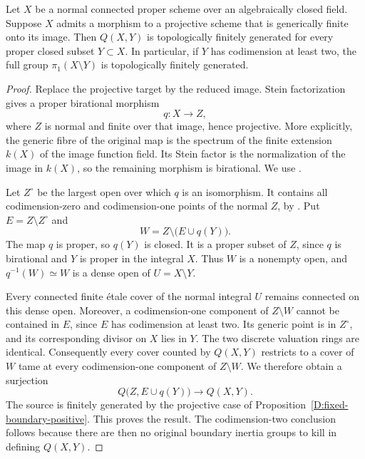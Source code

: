 \begin{proposition}
\label{D:generically-finite-projective-target}
Let $X$ be a normal connected proper scheme over an
algebraically closed field.  Suppose $X$ admits a morphism
to a projective scheme that is generically finite onto its
image.  Then $Q(X,Y)$ is topologically finitely generated
for every proper closed subset $Y\subset X$.
In particular, if $Y$ has codimension at least two, the
full group $\pi_1(X\setminus Y)$ is topologically finitely
generated.
\end{proposition}
\begin{proof}
Replace the projective target by the reduced image.
Stein factorization gives a proper birational morphism
\[
                              q:X\longrightarrow Z,
\]
where $Z$ is normal and finite over that image, hence
projective.  More explicitly, the generic fibre of the
original map is the spectrum of the finite extension
$k(X)$ of the image function field.  Its Stein factor
is the normalization of the image in $k(X)$, so the
remaining morphism is birational.  We use
\cite[Theorem 37.53.4, tag 03H0]{C_StacksFibration}.

Let $Z^\circ$ be the largest open over which $q$ is an
isomorphism.  It contains all codimension-zero and
codimension-one points of the normal $Z$, by
\cite[Lemma 33.17.3, tag 0BFP]{C_StacksProjectiveTarget}.
Put $E=Z\setminus Z^\circ$ and
\[
                  W=Z\setminus\bigl(E\cup q(Y)\bigr).
\]
The map $q$ is proper, so $q(Y)$ is closed.  It is a proper
subset of $Z$, since $q$ is birational and $Y$ is proper
in the integral $X$.  Thus $W$ is a nonempty open, and
$q^{-1}(W)\simeq W$ is a dense open of $U=X\setminus Y$.

Every connected finite \'etale cover of the normal
integral $U$ remains connected on this dense open.
Moreover, a codimension-one component of
$Z\setminus W$ cannot be contained in $E$, since $E$
has codimension at least two.  Its generic point is in
$Z^\circ$, and its corresponding divisor on $X$ lies
in $Y$.  The two discrete valuation rings are identical.
Consequently every cover counted by $Q(X,Y)$ restricts
to a cover of $W$ tame at every codimension-one component
of $Z\setminus W$.  We therefore obtain a surjection
\[
                 Q\bigl(Z,E\cup q(Y)\bigr)
                         \longrightarrow Q(X,Y).
\]
The source is finitely generated by the projective case
of Proposition~\ref{D:fixed-boundary-positive}.  This
proves the result.  The codimension-two conclusion follows
because there are then no original boundary inertia groups
to kill in defining $Q(X,Y)$.
\end{proof}

